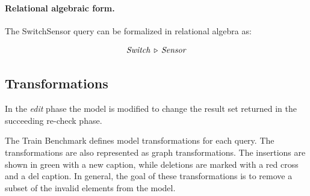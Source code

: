 \paragraph{Relational algebraic form.} The \textsf{SwitchSensor} query can be formalized in relational algebra as:

$$ \mathit{Switch} \, \triangleright \, \mathit{Sensor} $$


\subsection{Transformations}
\label{sec:transformatios}

In the \emph{edit} phase the model is modified to change the result set returned in the succeeding re-check phase.

The Train Benchmark defines model transformations for each query. The transformations are also represented as graph transformations. The insertions are shown in green with a \guillemotleft{}new\guillemotright{} caption, while deletions are marked with a red cross and a \guillemotleft{}del\guillemotright{} caption. In general, the goal of these transformations is to remove a subset of the invalid elements from the model.


